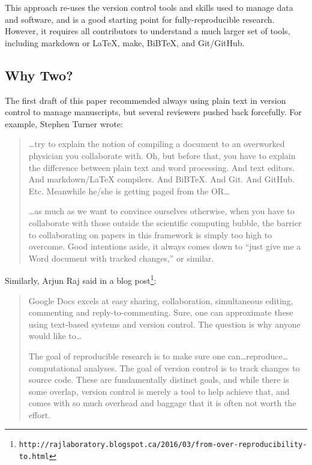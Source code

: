 \documentclass[10pt]{article}
\newcommand{\withurl}[2]{{#1}\footnote{\texttt{#2}}}
\begin{document}
This approach re-uses the version control tools and skills used to
manage data and software, and is a good starting point for
fully-reproducible research. However, it requires all contributors to
understand a much larger set of tools, including markdown or LaTeX,
make, BiBTeX, and Git/GitHub.

\subsection*{Why Two?}

The first draft of this paper recommended always using plain text in
version control to manage manuscripts, but several reviewers pushed
back forcefully. For example, Stephen Turner wrote:

\begin{quote}
{\ldots}try to explain the notion of compiling a document to an
overworked physician you collaborate with. Oh, but before that, you
have to explain the difference between plain text and word
processing. And text editors. And markdown/LaTeX compilers. And
BiBTeX. And Git. And GitHub. Etc. Meanwhile he/she is getting paged
from the OR{\ldots}

{\ldots}as much as we want to convince ourselves otherwise, when you
have to collaborate with those outside the scientific computing
bubble, the barrier to collaborating on papers in this framework is
simply too high to overcome. Good intentions aside, it always comes
down to ``just give me a Word document with tracked changes,'' or
similar.
\end{quote}

Similarly, Arjun Raj said in \withurl{a blog
  post}{http://rajlaboratory.blogspot.ca/2016/03/from-over-reproducibility-to.html}:

\begin{quote}
Google Docs excels at easy sharing, collaboration, simultaneous
editing, commenting and reply-to-commenting. Sure, one can approximate
these using text-based systems and version control. The question is
why anyone would like to{\ldots}

The goal of reproducible research is to make sure one
can{\dots}reproduce{\ldots}computational analyses. The goal of version
control is to track changes to source code. These are fundamentally
distinct goals, and while there is some overlap, version control is
merely a tool to help achieve that, and comes with so much overhead
and baggage that it is often not worth the effort.
\end{quote}
\end{document}
